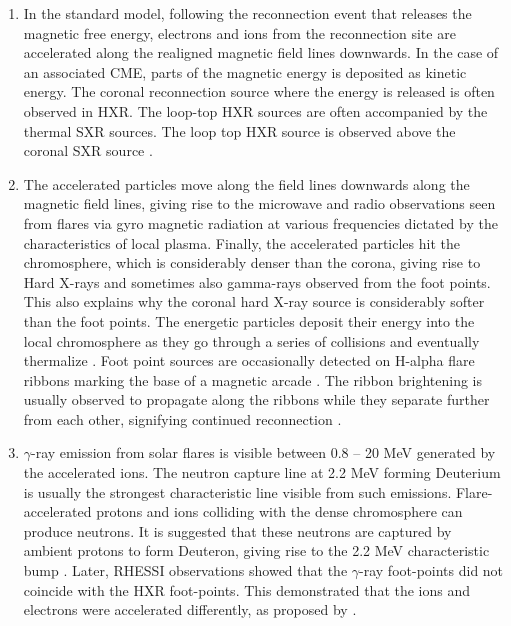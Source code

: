 \begin{enumerate}
    \item In the standard model, following the reconnection event that releases the magnetic free energy, electrons and ions from the reconnection site are accelerated along the realigned magnetic field lines downwards. In the case of an associated CME, parts of the magnetic energy is deposited as kinetic energy. The coronal reconnection source where the energy is released is often observed in HXR. The loop-top HXR sources are often accompanied by the thermal SXR sources. The loop top HXR source is observed above the coronal SXR source \citep{masuda94}.
    
    \item The accelerated particles move along the field lines downwards along the magnetic field lines, giving rise to the microwave and radio observations seen from flares via gyro magnetic radiation at various frequencies dictated by the characteristics of local plasma. Finally, the accelerated particles hit the chromosphere, which is considerably denser than the corona, giving rise to Hard X-rays and sometimes also gamma-rays observed from the foot points. This also explains why the coronal hard X-ray source is considerably softer than the foot points. The energetic particles deposit their energy into the local chromosphere as they go through a series of collisions and eventually thermalize \citep{brown83}. Foot point sources are occasionally detected on H-alpha flare ribbons marking the base of a magnetic arcade \citep{masuda01}. The ribbon brightening is usually observed to propagate along the ribbons while they separate further from each other, signifying continued reconnection \citep{tripathi06}.
 
    \item $\gamma$-ray emission from solar flares is visible between 0.8 {--} 20 MeV generated by the accelerated ions. The neutron capture line at 2.2 MeV forming Deuterium is usually the strongest characteristic line visible from such emissions. Flare-accelerated protons and ions colliding with the dense chromosphere can produce neutrons. It is suggested that these neutrons are captured by ambient protons to form Deuteron, giving rise to the 2.2 MeV characteristic bump \citep{ramtay74,hua87}. Later, RHESSI observations \citep{hurford_2003,hurford_2006} showed that the $\gamma$-ray foot-points did not coincide with the HXR foot-points. This demonstrated that the ions and electrons were accelerated differently, as proposed by \cite{emslie_2004}.


\end{enumerate}
